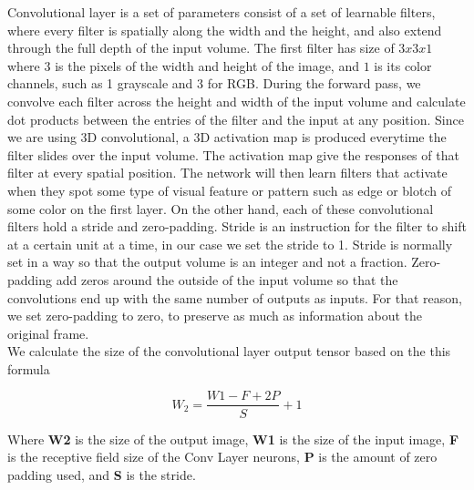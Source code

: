 Convolutional layer is a set of parameters consist of a set of learnable filters, where every filter is spatially along the width and the height, and also extend through the full depth of the input volume. The first filter has size of $3x3x1$ where $3$ is the pixels of the width and height of the image, and $1$ is its color channels, such as 1 grayscale and 3 for RGB. During the forward pass, we convolve each filter across the height and width of the input volume and calculate dot products between the entries of the filter and the input at any position. Since we are using 3D convolutional, a 3D activation map is produced everytime the filter slides over the input volume. The activation map give the responses of that filter at every spatial position. The network will then learn filters that activate when they spot some type of visual feature or pattern such as edge or blotch of some color on the first layer. On the other hand, each of these convolutional filters hold a stride and zero-padding. Stride is an instruction for the filter to shift at a certain unit at a time, in our case we set the stride to 1. Stride is normally set in a way so that the output volume is an integer and not a fraction. Zero-padding add zeros around the outside of the input volume so that the convolutions end up with the same number of outputs as inputs. For that reason, we set zero-padding to zero, to preserve as much as information about the original frame.\\
We calculate the size of the convolutional layer output tensor based on the this formula 

\begin{equation}
    W_{2}=\frac{W1-F+2P}{S} +1
\end{equation}

\hspace{5mm} Where \textbf{W2} is the size of the output image, \textbf{W1} is the size of the input image, \textbf{F} is the receptive field size of the Conv Layer neurons, \textbf{P} is the amount of zero padding used, and \textbf{S} is the stride.\\

